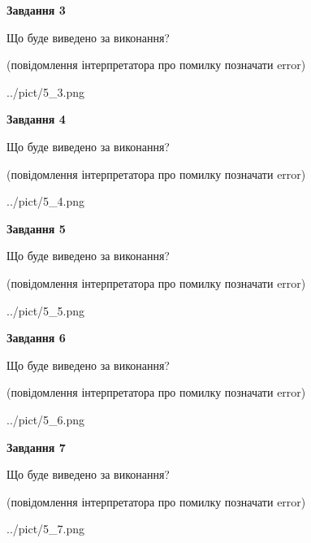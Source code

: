 \documentclass[12pt, ukrainian]{article}
\begin{document}
{\begin {large}
{\begin {center}\textbf{Завдання 3}\end {center}}\par
Що буде виведено за виконання?\par
 (повідомлення інтерпретатора про помилку позначати error)\par
\begin{center}
	{../pict/5_3.png}
\end{center}
\newpage

{\begin {center}\textbf{Завдання 4}\end {center}}\par
Що буде виведено за виконання?\par
 (повідомлення інтерпретатора про помилку позначати error)\par
\begin{center}
	{../pict/5_4.png}
\end{center}
\newpage

{\begin {center}\textbf{Завдання 5}\end {center}}\par
Що буде виведено за виконання?\par
 (повідомлення інтерпретатора про помилку позначати error)\par
\begin{center}
	{../pict/5_5.png}
\end{center}
\newpage

{\begin {center}\textbf{Завдання 6}\end {center}}\par
Що буде виведено за виконання?\par
 (повідомлення інтерпретатора про помилку позначати error)\par
\begin{center}
	{../pict/5_6.png}
\end{center}
\newpage

{\begin {center}\textbf{Завдання 7}\end {center}}\par
Що буде виведено за виконання?\par
 (повідомлення інтерпретатора про помилку позначати error)\par
\begin{center}
	{../pict/5_7.png}
\end{center}
\newpage


\end{large}}
\end{document}
